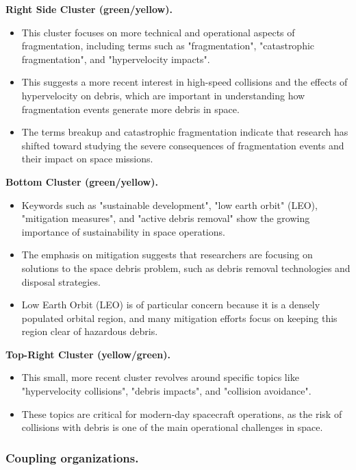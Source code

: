 \documentclass[journal ]{new-aiaa}
\begin{document}
\textbf{Right Side Cluster (green/yellow).}

\begin{itemize}
    \item This cluster focuses on more technical and operational aspects of fragmentation, including terms such as "fragmentation", "catastrophic fragmentation", and "hypervelocity impacts".
    \item This suggests a more recent interest in high-speed collisions and the effects of hypervelocity on debris, which are important in understanding how fragmentation events generate more debris in space.
    \item The terms breakup and catastrophic fragmentation indicate that research has shifted toward studying the severe consequences of fragmentation events and their impact on space missions.
\end{itemize}

\textbf{Bottom Cluster (green/yellow).}

\begin{itemize}
    \item Keywords such as "sustainable development", "low earth orbit" (LEO), "mitigation measures", and "active debris removal" show the growing importance of sustainability in space operations.
    \item The emphasis on mitigation suggests that researchers are focusing on solutions to the space debris problem, such as debris removal technologies and disposal strategies.
    \item Low Earth Orbit (LEO) is of particular concern because it is a densely populated orbital region, and many mitigation efforts focus on keeping this region clear of hazardous debris.
\end{itemize}

\textbf{Top-Right Cluster (yellow/green).}

\begin{itemize}
    \item This small, more recent cluster revolves around specific topics like "hypervelocity collisions", "debris impacts", and "collision avoidance".
    \item These topics are critical for modern-day spacecraft operations, as the risk of collisions with debris is one of the main operational challenges in space.
\end{itemize}

\subsubsection{Coupling organizations.}
\end{document}
